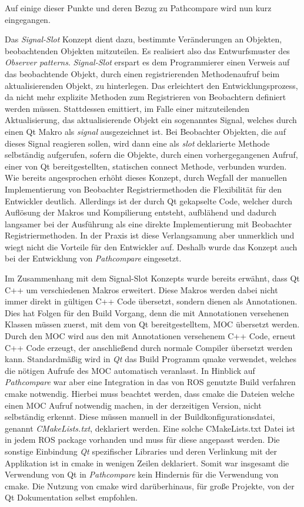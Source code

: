 Auf einige dieser Punkte und deren Bezug zu Pathcompare wird nun kurz eingegangen.

Das \textit{Signal-Slot} Konzept dient dazu, bestimmte Veränderungen an
Objekten, beobachtenden Objekten mitzuteilen.  Es realisiert also das
Entwurfsmuster des \textit{Observer patterns}.  \textit{Signal-Slot} erspart es
dem Programmierer einen Verweis auf das beobachtende Objekt, durch einen
registrierenden Methodenaufruf beim aktualisierenden Objekt, zu hinterlegen.
Das erleichtert den Entwicklungsprozess, da nicht mehr explizite Methoden zum
Registrieren von Beobachtern definiert werden müssen.  Stattdessen emittiert,
im Falle einer mitzuteilenden Aktualisierung, das aktualisierende Objekt ein
sogenanntes Signal, welches durch einen Qt Makro als \textit{signal}
ausgezeichnet ist. Bei Beobachter Objekten, die auf dieses Signal reagieren
sollen, wird dann eine als \textit{slot} deklarierte Methode selbständig
aufgerufen, sofern die Objekte, durch einen vorhergegangenen Aufruf, einer von
Qt bereitgestellten, statischen connect Methode, verbunden wurden. Wie bereits
angesprochen erhöht dieses Konzept, durch Wegfall der manuellen Implementierung
von Beobachter Registriermethoden die Flexibilität für den Entwickler deutlich.
Allerdings ist der durch Qt gekapselte Code, welcher durch Auflösung der Makros
und Kompilierung entsteht, aufblähend und dadurch langsamer bei der Ausführung
als eine direkte Implementierung mit Beobachter Registriermethoden. In der
Praxis ist diese Verlangsamung aber unmerklich und wiegt nicht die Vorteile für
den Entwickler auf. Deshalb wurde das Konzept auch bei der Entwicklung von
\textit{Pathcompare} eingesetzt. 

Im Zusammenhang mit dem Signal-Slot Konzepts wurde bereits erwähnt, dass Qt C++
um verschiedenen Makros erweitert. Diese Makros werden dabei nicht immer direkt
in gültigen C++ Code übersetzt, sondern dienen als Annotationen. Dies hat
Folgen für den Build Vorgang, denn die mit Annotationen versehenen Klassen
müssen zuerst, mit dem von Qt bereitgestelltem, \gls{MOC} übersetzt werden.
Durch den MOC wird aus den mit Annotationen versehenem C++ Code, erneut C++
Code erzeugt, der anschließend durch normale Compiler übersetzt werden kann.
Standardmäßig wird in \textit{Qt} das Build Programm qmake verwendet, welches
die nötigen Aufrufe des \gls{MOC} automatisch veranlasst. In Hinblick auf
\textit{Pathcompare} war aber eine Integration in das von ROS genutzte Build
verfahren cmake notwendig. Hierbei muss beachtet werden, dass cmake die Dateien
welche einen \gls{MOC} Aufruf notwendig machen, in der derzeitigen Version,
nicht selbständig erkennt. Diese müssen manuell in der
Buildkonfigurationsdatei, genannt \textit{CMakeLists.txt}, deklariert werden.
Eine solche CMakeLists.txt Datei ist in jedem ROS package vorhanden und muss
für diese angepasst werden. Die sonstige Einbindung \textit{Qt} spezifischer
Libraries und deren Verlinkung mit der Applikation ist in cmake in wenigen
Zeilen deklariert. Somit war insgesamt die Verwendung von Qt in
\textit{Pathcompare} kein Hindernis für die Verwendung von cmake. Die Nutzung
von cmake wird darüberhinaus, für große Projekte, von der Qt Dokumentation
selbst empfohlen.

